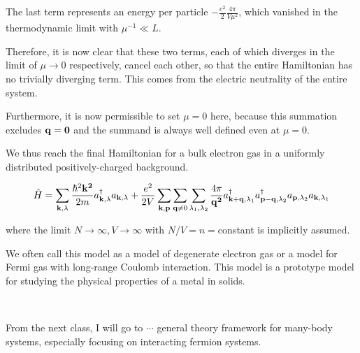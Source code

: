The last term represents an energy per particle $-\displaystyle\frac{e^2}{2}\frac{4\pi}{V\mu^2}$, which vanished in the thermodynamic limit with $\mu^{-1}\ll L$. 

Therefore, it is now clear that these two terms, each of which diverges in the limit of $\mu\to0$ respectively, cancel each other, so that the entire Hamiltonian has no trivially diverging term. This comes from the electric neutrality of the entire system. 

Furthermore, it is now permissible to set $\mu=0$ here, because this summation excludes $\bf q=0$ and the summand is always well defined even at $\mu =0$. 

We thus reach the final Hamiltonian for a bulk electron gas in a uniformly distributed positively-charged background. 

\begin{align}\label{eq1.8.14}
\hat{H}=\sum_{{\bf k},\lambda}\frac{\hbar^2\bf k^2}{2m}a^\dagger_{{\bf k},\lambda}a_{{\bf k},\lambda} + \frac{e^2}{2V}\sum_{\bf k,p} \sum_{{\bf q}\neq0}\sum_{\lambda_1,\lambda_2}\frac{4\pi}{{\bf q^2}}a^\dagger_{{\bf k+q},\lambda_1}a^\dagger_{{\bf p-q},\lambda_2}a_{{\bf p},\lambda_2}a_{{\bf k},\lambda_1}
\end{align}

where the limit $N\to\infty, V\to\infty$ with $N/V=n=$constant is implicitly assumed. 

We often call this model as a model of degenerate electron gas or a model for Fermi gas with long-range Coulomb interaction. This model is a prototype model for studying the physical properties of a metal in solids. 

\dotfill

\ 

From the next class, I will go to $\cdots$ general theory framework for many-body systems, especially focusing on interacting fermion systems. 